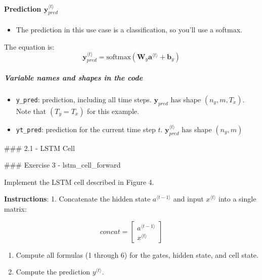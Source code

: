 \documentclass[11pt]{article}
\providecommand{\tightlist}{%
      \setlength{\itemsep}{0pt}\setlength{\parskip}{0pt}}
\begin{document}
    \hypertarget{prediction-mathbfylangle-t-rangle_pred}{%
\paragraph{\texorpdfstring{Prediction
\(\mathbf{y}^{\langle t \rangle}_{pred}\)}{Prediction \textbackslash mathbf\{y\}\^{}\{\textbackslash langle t \textbackslash rangle\}\_\{pred\}}}\label{prediction-mathbfylangle-t-rangle_pred}}

\begin{itemize}
\tightlist
\item
  The prediction in this use case is a classification, so you'll use a
  softmax.
\end{itemize}

The equation is:
\[\mathbf{y}^{\langle t \rangle}_{pred} = \textrm{softmax}(\mathbf{W}_{y} \mathbf{a}^{\langle t \rangle} + \mathbf{b}_{y})\]

\hypertarget{variable-names-and-shapes-in-the-code}{%
\subparagraph{Variable names and shapes in the
code}\label{variable-names-and-shapes-in-the-code}}

\begin{itemize}
\tightlist
\item
  \texttt{y\_pred}: prediction, including all time steps.
  \(\mathbf{y}_{pred}\) has shape \((n_{y}, m, T_{x})\). Note that
  \((T_{y} = T_{x})\) for this example.
\item
  \texttt{yt\_pred}: prediction for the current time step \(t\).
  \(\mathbf{y}^{\langle t \rangle}_{pred}\) has shape \((n_{y}, m)\)
\end{itemize}

    \#\#\# 2.1 - LSTM Cell

\#\#\# Exercise 3 - lstm\_cell\_forward

Implement the LSTM cell described in Figure 4.

\textbf{Instructions}: 1. Concatenate the hidden state
\(a^{\langle t-1 \rangle}\) and input \(x^{\langle t \rangle}\) into a
single matrix:

\[concat = \begin{bmatrix} a^{\langle t-1 \rangle} \\ x^{\langle t \rangle} \end{bmatrix}\]

\begin{enumerate}
\def\labelenumi{\arabic{enumi}.}
\setcounter{enumi}{1}
\tightlist
\item
  Compute all formulas (1 through 6) for the gates, hidden state, and
  cell state.
\item
  Compute the prediction \(y^{\langle t \rangle}\).
\end{enumerate}
\end{document}
